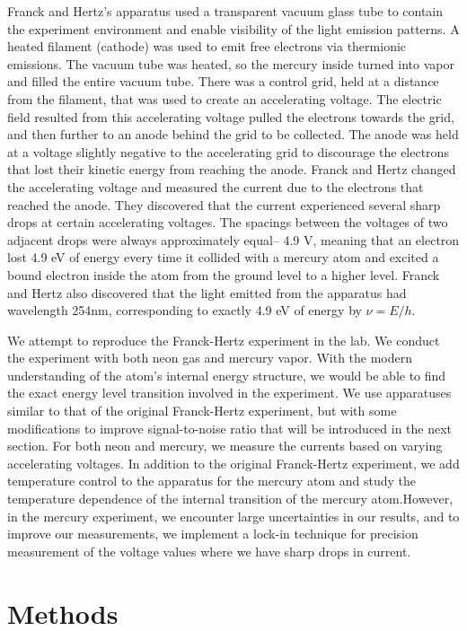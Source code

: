 \documentclass[prb,preprint]{revtex4-1}
\begin{document}
Franck and Hertz's apparatus used a transparent vacuum glass tube to contain the experiment environment and enable visibility of the light emission patterns. A heated filament (cathode) was used to emit free electrons via thermionic emissions. The vacuum tube was heated, so the mercury inside turned into vapor and filled the entire vacuum tube. There was a control grid, held at a distance from the filament, that was used to create an accelerating voltage. The electric field resulted from this accelerating voltage pulled the electrons towards the grid, and then further to an anode behind the grid to be collected. The anode was held at a voltage slightly negative to the accelerating grid to discourage the electrons that lost their kinetic energy from reaching the anode. Franck and Hertz changed the accelerating voltage and measured the current due to the electrons that reached the anode. They discovered that the current experienced several sharp drops at certain accelerating voltages. The spacings between the voltages of two adjacent drops were always approximately equal-- 4.9 V, meaning that an electron lost 4.9 eV of energy every time it collided with a mercury atom and excited a bound electron inside the atom from the ground level to a higher level. Franck and Hertz also discovered that the light emitted from the apparatus had wavelength 254nm, corresponding to exactly 4.9 eV of energy by $\nu=E/h$.

We attempt to reproduce the Franck-Hertz experiment in the lab. We conduct the experiment with both neon gas and mercury vapor. With the modern understanding of the atom's internal energy structure, we would be able to find the exact energy level transition involved in the experiment. We use apparatuses similar to that of the original Franck-Hertz experiment, but with some modifications to improve signal-to-noise ratio that will be introduced in the next section. For both neon and mercury, we measure the currents based on varying accelerating voltages. In addition to the original Franck-Hertz experiment, we add temperature control to the apparatus for the mercury atom and study the temperature dependence of the internal transition of the mercury atom.However, in the mercury experiment, we encounter large uncertainties in our results, and to improve our measurements, we implement a lock-in technique for precision measurement of the voltage values where we have sharp drops in current.

\section{Methods}
\end{document}
